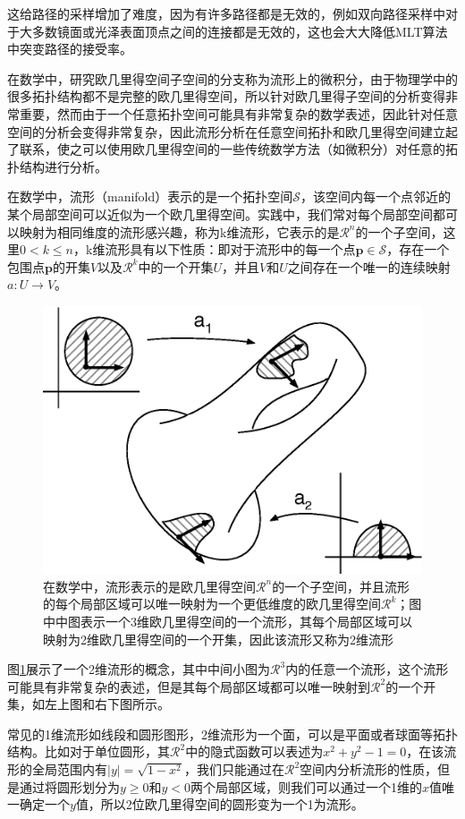 这给路径的采样增加了难度，因为有许多路径都是无效的，例如双向路径采样中对于大多数镜面或光泽表面顶点之间的连接都是无效的，这也会大大降低MLT算法中突变路径的接受率。

在数学中，研究欧几里得空间子空间的分支称为流形上的微积分\cite{b:CalculusonManifolds:AModernApproachtoClassicalTheoremsofAdvancedCalculus,b:AnalysisOnManifolds}，由于物理学中的很多拓扑结构都不是完整的欧几里得空间，所以针对欧几里得子空间的分析变得非常重要，然而由于一个任意拓扑空间可能具有非常复杂的数学表述，因此针对任意空间的分析会变得非常复杂，因此流形分析在任意空间拓扑和欧几里得空间建立起了联系，使之可以使用欧几里得空间的一些传统数学方法（如微积分）对任意的拓扑结构进行分析。

在数学中，流形（manifold）表示的是一个拓扑空间$\mathcal{S}$，该空间内每一个点邻近的某个局部空间可以近似为一个欧几里得空间。实践中，我们常对每个局部空间都可以映射为相同维度的流形感兴趣，称为k维流形，它表示的是$\mathcal{R}^{n}$的一个子空间，这里$0<k\leq n$，k维流形具有以下性质：即对于流形中的每一个点$\mathbf{p}\in\mathcal{S}$，存在一个包围点$\mathbf{p}$的开集$V$以及$\mathcal{R}^{k}$中的一个开集$U$，并且$V$和$U$之间存在一个唯一的连续映射$a:U\to V$。

\begin{figure}
\sidecaption
	\includegraphics[width=.5\textwidth]{figures/mlt/manifolds}
	\caption{在数学中，流形表示的是欧几里得空间$\mathcal{R}^{n}$的一个子空间，并且流形的每个局部区域可以唯一映射为一个更低维度的欧几里得空间$\mathcal{R}^{k}$；图中中图表示一个3维欧几里得空间的一个流形，其每个局部区域可以映射为2维欧几里得空间的一个开集，因此该流形又称为2维流形}
	\label{f:mlt-manifolds}
\end{figure}

图\ref{f:mlt-manifolds}展示了一个2维流形的概念，其中中间小图为$\mathcal{R}^{3}$内的任意一个流形，这个流形可能具有非常复杂的表述，但是其每个局部区域都可以唯一映射到$\mathcal{R}^{2}$的一个开集，如左上图和右下图所示。

常见的1维流形如线段和圆形图形，2维流形为一个面，可以是平面或者球面等拓扑结构。比如对于单位圆形，其$\mathcal{R}^{2}$中的隐式函数可以表述为$x^{2}+y^{2}-1=0$，在该流形的全局范围内有$|y|=\sqrt{1-x^{2}}$，我们只能通过在$\mathcal{R}^{2}$空间内分析流形的性质，但是通过将圆形划分为$y\geq 0$和$y<0$两个局部区域，则我们可以通过一个1维的$x$值唯一确定一个$y$值，所以2位欧几里得空间的圆形变为一个1为流形。

